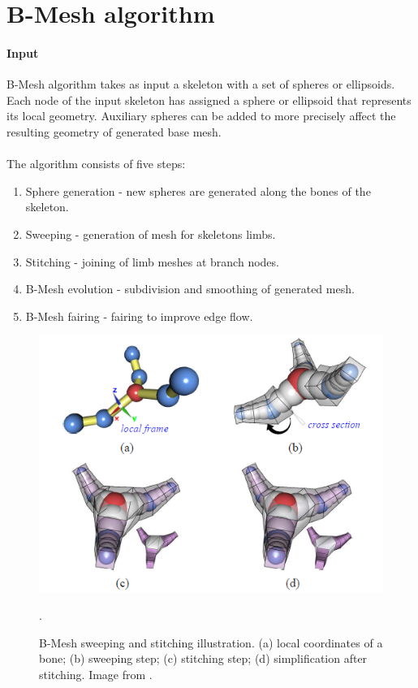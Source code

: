 \section{B-Mesh algorithm}
\paragraph{Input}
B-Mesh algorithm takes as input a skeleton with a set of spheres or ellipsoids. Each node of the input skeleton has assigned a sphere or ellipsoid that represents its local geometry. Auxiliary spheres can be added to more precisely affect the resulting geometry of generated base mesh.
\paragraph{}
The algorithm consists of five steps:
\begin{enumerate}
	\itemsep-0.25em 
	\item Sphere generation - new spheres are generated along the bones of the skeleton.
	\item Sweeping - generation of mesh for skeletons limbs.
	\item Stitching - joining of limb meshes at branch nodes.
	\item B-Mesh evolution - subdivision and smoothing of generated mesh.
	\item B-Mesh fairing - fairing to improve edge flow.
\end{enumerate}
\begin{figure}[h]
    \centering
    \includegraphics{images/b_mesh_ilu.png}
    \caption[B-Mesh sweeping and stitching illustration]{B-Mesh sweeping and stitching illustration. (a) local coordinates of a bone; (b) sweeping step; (c) stitching step; (d) simplification after stitching. Image from \cite{ji_bm}.}.
    \label{fig:b_mesh_stitch}
\end{figure}


